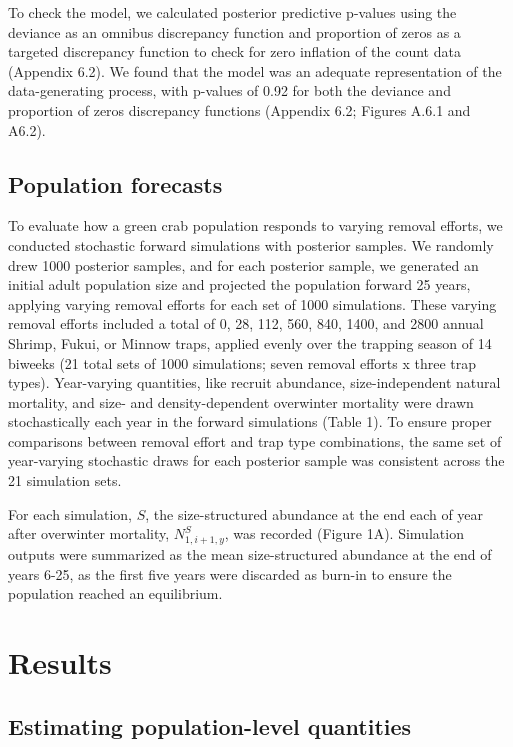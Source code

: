 \documentclass{article}
\begin{document}
To check the model, we calculated posterior predictive p-values using the deviance as an omnibus discrepancy function and proportion of zeros as a targeted discrepancy function to check for zero inflation of the count data (Appendix 6.2). We found that the model was an adequate representation of the data-generating process, with p-values of 0.92 for both the deviance and proportion of zeros discrepancy functions (Appendix 6.2; Figures A.6.1 and A6.2).


\subsection{Population forecasts}

To evaluate how a green crab population responds to varying removal efforts, we conducted stochastic forward simulations with posterior samples. We randomly drew 1000 posterior samples, and for each posterior sample, we generated an initial adult population size and projected the population forward 25 years, applying varying removal efforts for each set of 1000 simulations. These varying removal efforts included a total of 0, 28, 112, 560, 840, 1400, and 2800 annual Shrimp, Fukui, or Minnow traps, applied evenly over the trapping season of 14 biweeks (21 total sets of 1000 simulations; seven removal efforts x three trap types). Year-varying quantities, like recruit abundance, size-independent natural mortality, and size- and density-dependent overwinter mortality were drawn stochastically each year in the forward simulations (Table 1). To ensure proper comparisons between removal effort and trap type combinations, the same set of year-varying stochastic draws for each posterior sample was consistent across the 21 simulation sets. 

For each simulation, $S$, the size-structured abundance at the end each of year after overwinter mortality, $N^S_{1,i+1,y}$, was recorded (Figure 1A). Simulation outputs were summarized as the mean size-structured abundance at the end of years 6-25, as the first five years were discarded as burn-in to ensure the population reached an equilibrium.

\section{Results}

\subsection{Estimating population-level quantities}
\end{document}
